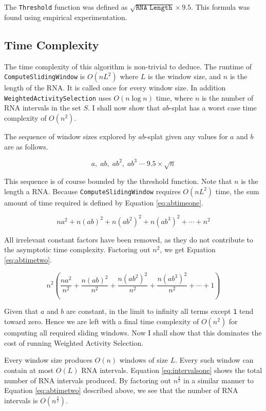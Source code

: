 \documentclass{cshonours}
\begin{document}
The \texttt{Threshold} function was defined as $\sqrt{ \texttt{RNA Length} } \times 9.5$. This formula was found using empirical experimentation.

\subsection{Time Complexity}

The time complexity of this algorithm is non-trivial to deduce. The runtime of \texttt{ComputeSlidingWindow} is $O(nL^2)$ where $L$ is the window size, and $n$ is the length of the RNA. It is called once for every window size. In addition \texttt{WeightedActivitySelection} uses $O(n \log n)$ time, where $n$ is the number of RNA intervals in the set $S$. I shall now show that $ab$-splat has a worst case time complexity of $O(n^2)$.

The sequence of window sizes explored by $ab$-splat given any values for $a$ and $b$ are as follows.

\begin{equation}
	a, \; ab, \; ab^2, \; ab^3 \; \cdots \; 9.5\times\sqrt{n}
\end{equation}

This sequence is of course bounded by the threshold function. Note that $n$ is the length a RNA. Because \texttt{ComputeSlidingWindow} requires $O(nL^2)$ time, the sum amount of time required is defined by Equation \ref{eq:abtimeone}.

\begin{equation}  \label{eq:abtimeone}
	n a^2 + n(a b)^2 + n(a b^2)^2 + n(a b^3)^2 + \cdots + n^2
\end{equation}


All irrelevant constant factors have been removed, as they do not contribute to the asymptotic time complexity. Factoring out $n^2$, we get Equation \ref{eq:abtimetwo}.

\begin{equation} \label{eq:abtimetwo}
	n^2 ( \frac{n a^2}{n^2} + \frac{n(a b)^2}{n^2} + \frac{n(a b^2)^2}{n^2} + \frac{n(a b^3)^2}{n^2} + \cdots + 1)
\end{equation}

Given that $a$ and $b$ are constant, in the limit to infinity all terms except \texttt{1} tend toward zero. Hence we are left with a final time complexity of $O(n^2)$ for computing all required sliding windows. Now I shall show that this dominates the cost of running Weighted Activity Selection.

Every window size produces $O(n)$ windows of size $L$. Every such window can contain at most $O(L)$ RNA intervals. Equation \ref{eq:intervalsone} shows the total number of RNA intervals produced. By factoring out $n^\frac{3}{2}$ in a similar manner to Equation \ref{eq:abtimetwo} described above, we see that the number of RNA intervals is $O(n^\frac{3}{2})$.
\end{document}
